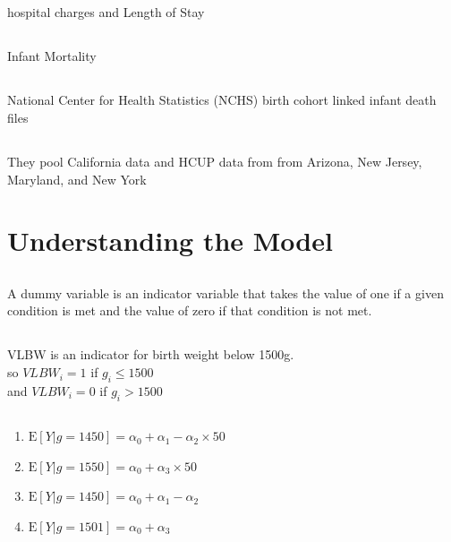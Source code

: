 \documentclass[11pt]{article}
\newcommand{\E}{\mathrm{E}}
\begin{document}
\subsection{}
hospital charges and Length of Stay

\subsection{}
Infant Mortality

\subsection{}
National Center for Health Statistics (NCHS) birth cohort linked infant death files 

\subsection{}
They pool California data and HCUP data from from Arizona, New Jersey, Maryland, and New York

\section{Understanding the Model}

\subsection{}
 A dummy variable is an indicator variable that takes the value of one if a given condition is met and      the value of zero if that condition is not met. 
 
 \subsection{}
 VLBW is an indicator for birth weight below 1500g. \\
 so $VLBW_i = 1 $ if $g_i \leq 1500$ \\
 and  $VLBW_i = 0 $ if $g_i > 1500$
 
 \subsection{}
 
  \renewcommand{\theenumi}{\roman{enumi}}
  \begin{enumerate}
  	\item $\E[Y|g=1450] = \alpha_0 + \alpha_1 - \alpha_2 \times 50 $
  	\item $\E[Y|g=1550] = \alpha_0 + \alpha_3 \times 50 $
  	\item$\E[Y|g=1450] = \alpha_0 + \alpha_1 - \alpha_2$
  		\item $\E[Y|g=1501] = \alpha_0 + \alpha_3$
  \end{enumerate}
\end{document}
